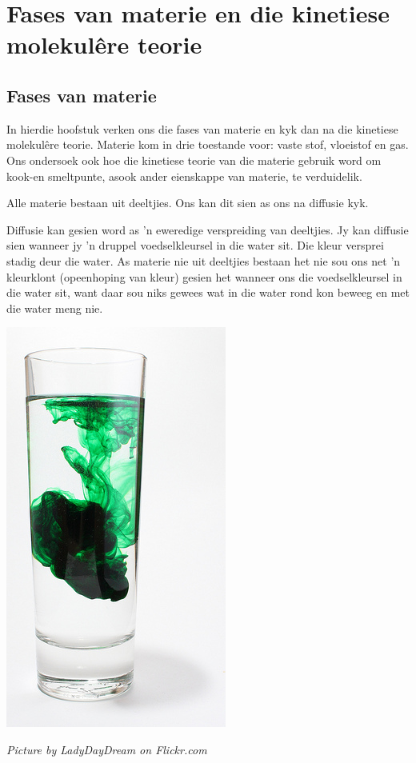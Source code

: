          \chapter{Fases van materie en die kinetiese molekul\^{e}re teorie}
    \setcounter{figure}{1}
    \setcounter{subfigure}{1}
\label{m38736*cid2}
            \section{Fases van materie}
            \nopagebreak

\label{m38736*id802341}In hierdie hoofstuk verken ons die fases van materie en kyk dan na die kinetiese molekul\^{e}re teorie. Materie kom in drie toestande voor: vaste stof, vloeistof en gas. Ons ondersoek ook hoe die kinetiese teorie van die materie gebruik word om kook-en smeltpunte, asook ander eienskappe van materie, te verduidelik.\par 

\label{m38736*id324876121}Alle materie bestaan uit deeltjies. Ons kan dit sien as ons na diffusie kyk. \par
{} 
\begin{minipage}{.5\textwidth}
Diffusie kan gesien word as  'n eweredige verspreiding van deeltjies. Jy kan diffusie sien wanneer jy  'n druppel voedselkleursel in die water sit. Die kleur versprei stadig deur die water. As materie nie uit deeltjies bestaan het nie sou ons net  'n kleurklont (opeenhoping van kleur) gesien het wanneer ons die voedselkleursel in die water sit, want daar sou niks gewees wat in die water rond kon beweeg en met die water meng nie.
\end{minipage}
\begin{minipage}{.5\textwidth}
\begin{center}
 \includegraphics[height=.5\textwidth]{photos/diffusionby-LadyDayDream-flickr.jpg}\par
\textit{Picture by LadyDayDream on Flickr.com}
\end{center}
\end{minipage}

